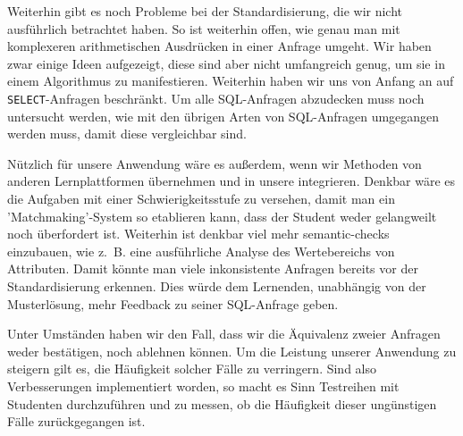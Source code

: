 Weiterhin gibt es noch Probleme bei der Standardisierung, die wir nicht ausführlich betrachtet haben. So ist weiterhin offen, wie genau man mit komplexeren arithmetischen Ausdrücken in einer Anfrage umgeht. Wir haben zwar einige Ideen aufgezeigt, diese sind aber nicht umfangreich genug, um sie in einem Algorithmus zu manifestieren. Weiterhin haben wir uns von Anfang an auf \verb|SELECT|-Anfragen beschränkt. Um alle SQL-Anfragen abzudecken muss noch untersucht werden, wie mit den übrigen Arten von SQL-Anfragen umgegangen werden muss, damit diese vergleichbar sind. 

Nützlich für unsere Anwendung wäre es außerdem, wenn wir Methoden von anderen Lernplattformen übernehmen und in unsere integrieren. Denkbar wäre es die Aufgaben mit einer Schwierigkeitsstufe zu versehen, damit man ein 'Matchmaking'-System so etablieren kann, dass der Student weder gelangweilt noch überfordert ist. Weiterhin ist denkbar viel mehr semantic-checks einzubauen, wie \mbox{z. B.} eine ausführliche Analyse des Wertebereichs von Attributen. Damit könnte man viele inkonsistente Anfragen bereits vor der Standardisierung erkennen. Dies würde dem Lernenden, unabhängig von der Musterlösung, mehr Feedback zu seiner SQL-Anfrage geben. 

Unter Umständen haben wir den Fall, dass wir die Äquivalenz zweier Anfragen weder bestätigen, noch ablehnen können. Um die Leistung unserer Anwendung zu steigern gilt es, die Häufigkeit solcher Fälle zu verringern. Sind also Verbesserungen implementiert worden, so macht es Sinn Testreihen mit Studenten durchzuführen und zu messen, ob die Häufigkeit dieser ungünstigen Fälle zurückgegangen ist.

